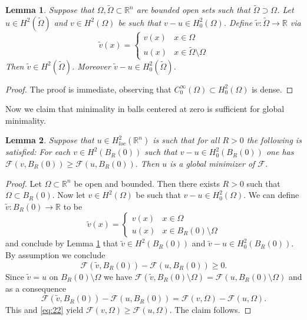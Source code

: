 \documentclass[twoside,11pt]{article}
\newtheorem{lemma}{Lemma}
\theoremstyle{definition}
\begin{document}
\begin{lemma}\label{lem:3}
    Suppose that $\Omega, \tilde{\Omega} \subset \mathbb{R}^n$ are bounded open sets such that $\tilde{\Omega} \supset \Omega$. Let $u \in H^2(\tilde{\Omega})$ and $v \in H^2(\Omega)$ be such that $v- u \in H_0^2(\Omega)$. Define $\tilde{v} : \tilde{\Omega} \rightarrow \mathbb{R}$ via 
    \begin{equation*}
        \tilde{v}(x) = \begin{cases}
             v(x) & x \in \Omega \\ u(x) & x \in \tilde{\Omega} \setminus \Omega
        \end{cases}
    \end{equation*}
    Then $\tilde{v} \in H^2(\tilde{\Omega})$. Moreover $\tilde{v}- u \in H_0^2(\tilde{\Omega})$. 
\end{lemma}
\begin{proof} The proof is immediate, observing that $C_0^\infty(\Omega)\subset H_0^2(\Omega)$ is dense.
\end{proof}

Now we claim that minimality in balls centered at zero is sufficient for global minimality. 

\begin{lemma}\label{lem:BR(0)istgenug}
Suppose that $u \in H^2_{loc}(\mathbb{R}^n)$ is such that for all $R> 0$ the following is satisfied: For each $v \in H^2(B_R(0))$ such that $v-u \in H_0^2(B_R(0))$ one has $\mathcal{F}(v,B_R(0)) \geq \mathcal{F}(u,B_R(0)).$ Then $u$ is a global minimizer of $\mathcal{F}$.  
\end{lemma}
\begin{proof}
    Let $\Omega \subset \mathbb{R}^n$ be open and bounded. Then there exists $R> 0$ such that $\Omega \subset B_R(0)$. Now let $v \in H^2(\Omega)$ be such that $v- u \in H_0^2(\Omega)$.
    We can define $\tilde{v}: B_R(0) \rightarrow \mathbb{R}$ to be 
    \begin{equation*}
        \tilde{v}(x) = \begin{cases}
             v(x) & x \in \Omega \\ u(x) & x \in B_R(0) \setminus \Omega
        \end{cases}
    \end{equation*}
   and conclude by Lemma \ref{lem:3} that $\tilde{v} \in H^2(B_R(0))$ and $\tilde{v} - u  \in H_0^2(B_R(0))$. By assumption we conclude 
   \begin{equation}\label{eq:22}
       \mathcal{F}(\tilde{v}, B_R(0)) - \mathcal{F}(u, B_R(0)) \geq 0.
   \end{equation}
   Since $\tilde{v}= u$ on $ B_R(0) \setminus \Omega$ we have $\mathcal{F}(\tilde{v}, B_R(0) \setminus \Omega) = \mathcal{F}(u, B_R(0) \setminus \Omega)$ and as a consequence
   \begin{equation*}
        \mathcal{F}(\tilde{v}, B_R(0)) - \mathcal{F}(u, B_R(0)) = \mathcal{F}(v, \Omega) - \mathcal{F}(u, \Omega).
   \end{equation*}
   This and \eqref{eq:22} yield $\mathcal{F}(v, \Omega) \geq \mathcal{F}(u, \Omega)$. The claim follows. 
\end{proof}
\end{document}

